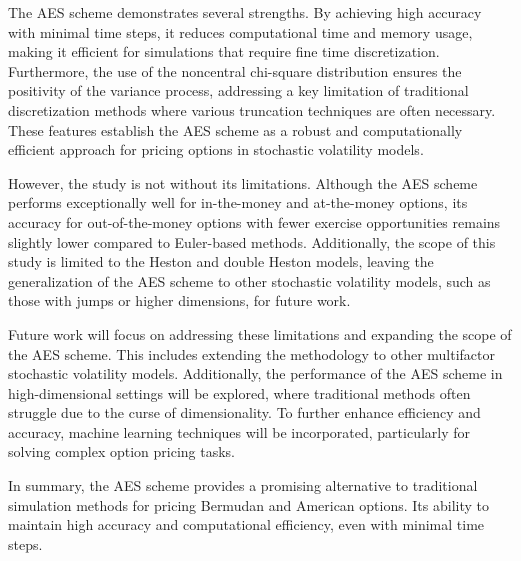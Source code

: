 \documentclass[]{interact}
\theoremstyle{plain}%
\theoremstyle{definition}
\theoremstyle{remark}
\begin{document}
The AES scheme demonstrates several strengths. By achieving high accuracy with minimal time steps, it reduces computational time and memory usage, making it efficient for simulations that require fine time discretization. Furthermore, the use of the noncentral chi-square distribution ensures the positivity of the variance process, addressing a key limitation of traditional discretization methods where various truncation techniques are often necessary. These features establish the AES scheme as a robust and computationally efficient approach for pricing options in stochastic volatility models.

However, the study is not without its limitations. Although the AES scheme performs exceptionally well for in-the-money and at-the-money options, its accuracy for out-of-the-money options with fewer exercise opportunities remains slightly lower compared to Euler-based methods. Additionally, the scope of this study is limited to the Heston and double Heston models, leaving the generalization of the AES scheme to other stochastic volatility models, such as those with jumps or higher dimensions, for future work.

Future work will focus on addressing these limitations and expanding the scope of the AES scheme. This includes extending the methodology to other multifactor stochastic volatility models. Additionally, the performance of the AES scheme in high-dimensional settings will be explored, where traditional methods often struggle due to the curse of dimensionality. To further enhance efficiency and accuracy, machine learning techniques will be incorporated, particularly for solving complex option pricing tasks. 

In summary, the AES scheme provides a promising alternative to traditional simulation methods for pricing Bermudan and American options. Its ability to maintain high accuracy and computational efficiency, even with minimal time steps.
\end{document}
